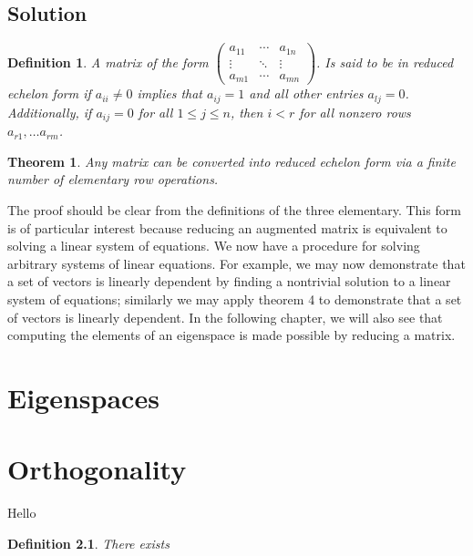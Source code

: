 \documentclass{amsbook}
\newtheorem{defn}{Definition}
\newtheorem{thm}{Theorem}
\begin{document}
\section*{Solution}
\begin{defn}
  A matrix of the form $\begin{pmatrix} a_{11} & \cdots & a_{1n}\\ \vdots & \ddots & \vdots \\a_{m1} & \cdots & a_{mn}\end{pmatrix}$. Is said to be in reduced echelon form if $a_{ii}\neq 0$ implies that $a_{ij}=1$ and all other entries $a_{lj}=0$. Additionally, if $a_{ij}=0$
  for all $1\leq j \leq n$, then $i < r$ for all nonzero rows $a_{r1}, \dots a_{rm}$.
\end{defn}
\begin{thm}
Any matrix can be converted into reduced echelon form via a finite number of elementary row operations.
\end{thm}
The proof should be clear from the definitions of the three elementary.
This form is of particular interest because reducing an augmented matrix is equivalent to solving a linear system of equations. We now have a
procedure for solving arbitrary systems of linear equations. For example, we may now demonstrate that a set of vectors is linearly dependent by
finding a nontrivial solution to a linear system of equations; similarly we may apply theorem 4 to demonstrate that a set of vectors is linearly dependent. In the following chapter, we will also see that computing the elements of an eigenspace is made possible by reducing a matrix.
\chapter{Eigenspaces}
\chapter{Orthogonality}

Hello
\begin{defn}
  There exists
\end{defn}
\end{document}
